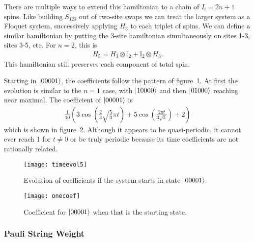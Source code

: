 There are multiple ways to extend this hamiltonian to a chain of $L= 2n+1$ spins. Like building $S_{123}$ out of two-site swaps we can treat the larger system as a Floquet system, successively applying $H_3$ to each triplet of spins. We can define a similar hamiltonian by putting the 3-site hamiltonian simultaneously on sites 1-3, sites 3-5, etc. For $n=2$, this is
\begin{align}
H_5 = H_3\otimes\mathbb{I}_2 + \mathbb{I}_2\otimes H_3.
\end{align} 
This hamiltonian still preserves each component of total spin. 

Starting in $\left|00001\right\rangle$, the coefficients follow the pattern of figure~\ref{fig:timeevol5}. At first the evolution is similar to the $n=1$ case, with $\left|10000\right\rangle$ and then $\left|01000\right\rangle$ reaching near maximal. The coefficient of $\left|00001\right\rangle$ is 
\begin{align}
\frac{1}{10} \left(3 \cos \left(\frac{2}{3} \sqrt{\frac{5}{3}} \pi  t\right)+5 \cos \left(\frac{2 \pi  t}{3 \sqrt{3}}\right)+2\right)
\end{align} 
which is shown in figure~\ref{fig:onecoef}. Although it appears to be quasi-periodic, it cannot ever reach 1 for $t\ne 0$ or be truly periodic because its time coefficients are not rationally related.

\begin{figure}
	\centering
	\texttt{[image: timeevol5]}
	\caption{Evolution of coefficients if the system starts in state $\left|00001\right\rangle$.}
	\label{fig:timeevol5}
\end{figure}

\begin{figure}
	\centering
	\texttt{[image: onecoef]}
	\caption{Coefficient for $\left|00001\right\rangle$ when that is the starting state.}
	\label{fig:onecoef}
\end{figure}


\subsubsection{Pauli String Weight} \label{subsub:operator_dynamics} \emph{} 

